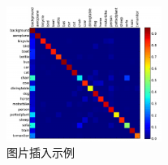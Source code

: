 \begin{figure}[h] 
	\centering
	\includegraphics[width=0.45\textwidth]{image/chap02/confusion.pdf}
	\caption{图片插入示例}
	\label{fig:confusion}
\end{figure}
